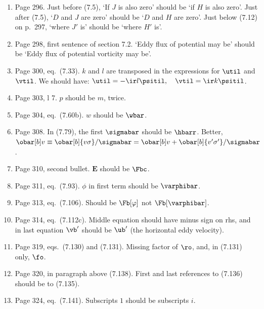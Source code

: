 \documentclass[10pt]{article}
\newcommand{\eq}{eq.\ } \newcommand{\Eq}{Eq.\ }
\begin{document}
\begin{enumerate}
\item Page 296. Just before (7.5), `If $J$ is also zero' should be `if $H$ is also zero'. Just after (7.5), `$D$ and $J$ are zero' should be `$D$ and $H$ are zero'. Just below (7.12) on p.\ 297, `where $J'$ is' should be `where $H'$ is'.

\item Page 298, first sentence of section 7.2. `Eddy flux of potential may be' should be `Eddy flux of potential vorticity may be'.

\item Page 300, \eq (7.33). $k$ and $l$ are transposed in the expressions for $\util$ and $\vtil$. We should have:
     $  \util  =  - \ir l \psitil,  \quad \vtil = \ir k \psitil$. 

\item Page 303, l 7. $p$ should be $m$, twice. 

\item Page 304, \eq (7.60b). $w$ should be $\wbar$. 

\item Page 308. In (7.79), the first $\sigmabar$ should be $\hbarr$. Better, 
$\obar[b]v \equiv  \obar[b]{v \sigma}/\sigmabar =  \obar[b] v + \obar[b]{v'\sigma'} /\sigmabar  $.

\item Page 310, second bullet. $\bm E$ should be $\Fbc$.

\item Page 311, \eq (7.93). $\phi$ in first term should be $\varphibar$.

\item Page 313, \eq (7.106). Should be $\Fb[\varphi]$ not $\Fb[\varphibar]$.

\item Page 314, \eq (7.112c). Middle equation should have minus sign on rhs, and in last equation $\vb'$ should be $\ub'$ (the horizontal eddy velocity).


\item Page 319, eqs.\ (7.130) and (7.131). Missing factor of $\ro$, and, in (7.131) only, $\fo$.

\item Page 320, in paragraph above (7.138). First and last references to (7.136) should be to (7.135).

\item Page 324, \eq (7.141). Subscripts $1$ should be subscripts $i$. 


\end{enumerate}
\end{document}
